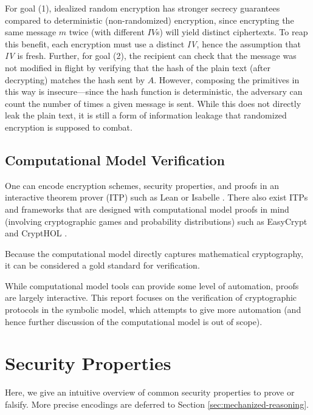 \documentclass{article}
\theoremstyle{definition}
\begin{document}
For goal (1), idealized random encryption has stronger secrecy guarantees compared to deterministic (non-randomized) encryption, 
since encrypting the same message $m$ twice (with different $\textit{IV}$s) will yield distinct ciphertexts.
To reap this benefit, each encryption must use a distinct \emph{IV}, hence the assumption that \emph{IV} is fresh.
Further, for goal (2), the recipient can check that the message was not modified in flight by verifying 
that the hash of the plain text (after decrypting) matches the hash sent by $A$. 
However, composing the primitives in this way is insecure---since the hash function is deterministic, 
the adversary can count the number of times a given message is sent. 
While this does not directly leak the plain text, it is still a form of information leakage 
that randomized encryption is supposed to combat.

\subsection{Computational Model Verification}\label{sec:computational-model}
One can encode encryption schemes, security properties, and proofs in an interactive theorem prover (ITP) 
such as Lean \cite{lean} or Isabelle \cite{isabelle}. 
There also exist ITPs and frameworks that are designed with computational model proofs in mind 
(involving cryptographic games and probability distributions) 
such as EasyCrypt \cite{easycrypt} and CryptHOL \cite{crypthol}. 

Because the computational model directly captures mathematical cryptography, 
it can be considered a gold standard for verification.

While computational model tools can provide some level of automation, proofs are largely interactive. 
This report focuses on the verification of cryptographic protocols in the symbolic model, 
which attempts to give more automation (and hence further discussion of the computational model is out of scope).


\section{Security Properties}\label{sec:security-properties}

Here, we give an intuitive overview of common security properties to prove or falsify. 
More precise encodings are deferred to Section \ref{sec:mechanized-reasoning}.
\end{document}
